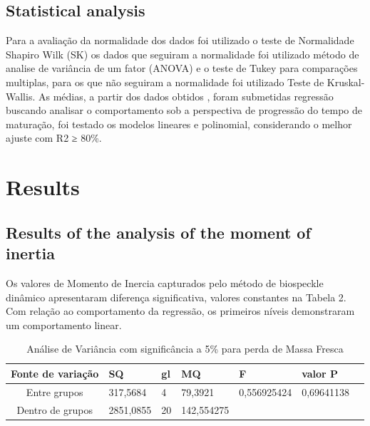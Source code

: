 \documentclass{elsarticle}
\begin{document}
\newpage
\subsection{Statistical analysis}

Para a avaliação da normalidade dos dados foi utilizado o teste de Normalidade Shapiro Wilk (SK) os dados que seguiram a normalidade foi utilizado método de analise de variância de um fator (ANOVA) e o teste de Tukey para comparações multiplas, para os que não seguiram a normalidade foi utilizado Teste de Kruskal-Wallis. As médias, a partir dos dados obtidos , foram submetidas regressão buscando analisar o comportamento sob a perspectiva de progressão do tempo de maturação, foi testado os modelos lineares e polinomial, considerando o melhor ajuste com R2 ≥ 80\%.

\section{Results}

\subsection{Results of the analysis of the moment of inertia}


Os valores de Momento de Inercia capturados pelo método de biospeckle dinâmico apresentaram diferença significativa, valores constantes na Tabela 2. Com relação ao comportamento da regressão, os primeiros níveis demonstraram um comportamento linear.

\begin{table}[ht]\footnotesize
\centering
\caption{Análise de Variância com significância a 5\% para perda de Massa Fresca}
\label{anova_massa}
\begin{tabular}{|c|l|l|l|l|l|l|}
\hline
Fonte de variação & SQ       & gl & MQ         & F           & valor P                         \\ \hline
Entre grupos      & 317,5684 & 4  & 79,3921   & 0,556925424 & {\color[HTML]{FD6864} 0,69641138}\\ \hline
Dentro de grupos  & 2851,0855 & 20 & 142,554275 &             &                            \\ \hline
\end{tabular}
\end{table}
\end{document}
